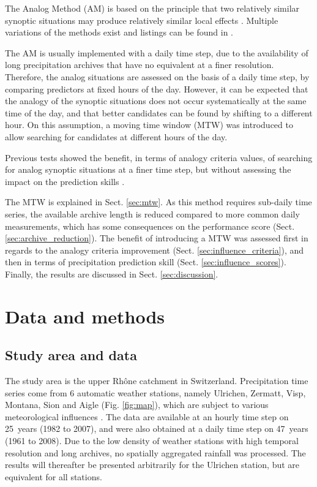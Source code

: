 \documentclass[hess, manuscript]{copernicus}
\begin{document}
\introduction  %
\label{sec:introduction}

The Analog Method (AM) is based on the principle that two relatively similar synoptic situations may produce relatively similar local effects \citep{Lorenz1956, Lorenz1969}. Multiple variations of the methods exist and listings can be found in \citet{BenDaoud2016}.

The AM is usually implemented with a daily time step, due to the availability of long precipitation archives that have no equivalent at a finer resolution. Therefore, the analog situations are assessed on the basis of a daily time step, by comparing predictors at fixed hours of the day. However, it can be expected that the analogy of the synoptic situations does not occur systematically at the same time of the day, and that better candidates can be found by shifting to a different hour. On this assumption, a moving time window (MTW) was introduced to allow searching for candidates at different hours of the day.

Previous tests showed the benefit, in terms of analogy criteria values, of searching for analog synoptic situations at a finer time step, but without assessing the impact on the prediction skills \citep{Finet2008}. 


The MTW is explained in Sect. \ref{sec:mtw}. As this method requires sub-daily time series, the available archive length is reduced compared to more common daily measurements, which has some consequences on the performance score (Sect. \ref{sec:archive_reduction}). The benefit of introducing a MTW was assessed first in regards to the analogy criteria improvement (Sect. \ref{sec:influence_criteria}), and then in terms of precipitation prediction skill (Sect. \ref{sec:influence_scores}). Finally, the results are discussed in Sect. \ref{sec:discussion}.



\section{Data and methods}

\subsection{Study area and data}
\label{sec:data}

The study area is the upper Rh\^{o}ne catchment in Switzerland. Precipitation time series come from 6 automatic weather stations, namely Ulrichen, Zermatt, Visp, Montana, Sion and Aigle (Fig. \ref{fig:map}), which are subject to various meteorological influences \citep{Horton2012}. The data are available at an hourly time step on 25~years (1982 to 2007), and were also obtained at a daily time step on 47~years (1961 to 2008). Due to the low density of weather stations with high temporal resolution and long archives, no spatially aggregated rainfall was processed. The results will thereafter be presented arbitrarily for the Ulrichen station, but are equivalent for all stations.
\end{document}
